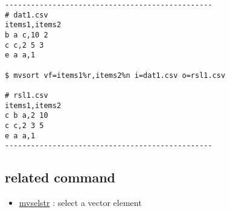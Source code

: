 \documentclass[a4paper]{jarticle}
\begin{document}
\begin{verbatim}
------------------------------------------------
# dat1.csv
items1,items2
b a c,10 2
c c,2 5 3
e a a,1

$ mvsort vf=items1%r,items2%n i=dat1.csv o=rsl1.csv

# rsl1.csv
items1,items2
c b a,2 10
c c,2 3 5
e a a,1
------------------------------------------------
\end{verbatim}


\subsection*{related command}
\begin{itemize}
\item \href{run:mvselstr.pdf}{mvselstr} : select a vector element 
\end{itemize}
\end{document}
